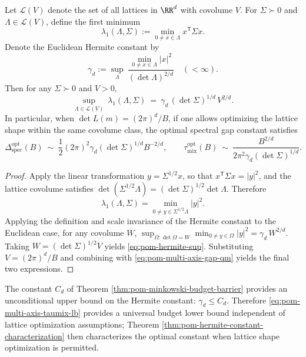 \begin{theorem}\label{thm:pom-hermite-constant-characterization}
Let \(\mathcal{L}(V)\) denote the set of all lattices in \(\RR^d\) with covolume \(V\).
For \(\Sigma\succ 0\) and \(\Lambda\in\mathcal{L}(V)\), define the first minimum
\[
\lambda_1(\Lambda,\Sigma):=\min_{0\neq x\in\Lambda}x^{\mathsf T}\Sigma x.
\]
Denote the Euclidean Hermite constant by
\[
\gamma_d:=\sup_{\Lambda}\ \frac{\min_{0\neq x\in\Lambda}|x|^{2}}{(\det\Lambda)^{2/d}}\quad(<\infty).
\]
Then for any \(\Sigma\succ 0\) and \(V>0\),
\begin{equation}\label{eq:pom-hermite-sup}
\sup_{\Lambda\in\mathcal{L}(V)}\ \lambda_1(\Lambda,\Sigma)
\ =\ \gamma_d\,(\det\Sigma)^{1/d}\,V^{2/d}.
\end{equation}
In particular, when \(\det L(m)=(2\pi)^d/B\), if one allows optimizing the lattice shape within the same covolume class, the optimal spectral gap constant satisfies
\[
\Delta_{\mathrm{spec}}^{\mathrm{opt}}(B)\ \sim\ \frac12(2\pi)^2\gamma_d(\det\Sigma)^{1/d}B^{-2/d},
\qquad
\tau_{\mathrm{mix}}^{\mathrm{opt}}(B)\ \sim\ \frac{B^{2/d}}{2\pi^2\gamma_d(\det\Sigma)^{1/d}}.
\]
\end{theorem}

\begin{proof}
Apply the linear transformation \(y=\Sigma^{1/2}x\), so that \(x^{\mathsf T}\Sigma x=|y|^2\), and the lattice covolume satisfies
\(
\det(\Sigma^{1/2}\Lambda)=(\det\Sigma)^{1/2}\det\Lambda
\).
Therefore
\[
\lambda_1(\Lambda,\Sigma)
=\min_{0\neq y\in\Sigma^{1/2}\Lambda}|y|^2.
\]
Applying the definition and scale invariance of the Hermite constant to the Euclidean case, for any covolume \(W\),
\(
\sup_{\Omega:\det\Omega=W}\min_{0\neq y\in\Omega}|y|^2=\gamma_d\,W^{2/d}
\).
Taking \(W=(\det\Sigma)^{1/2}V\) yields \eqref{eq:pom-hermite-sup}.
Substituting \(V=(2\pi)^d/B\) and combining with \eqref{eq:pom-multi-axis-gap-qm} yields the final two expressions.
\end{proof}

\begin{remark}\label{rem:pom-minkowski-vs-hermite}
The constant \(C_d\) of Theorem \ref{thm:pom-minkowski-budget-barrier} provides an unconditional upper bound on the Hermite constant: \(\gamma_d\le C_d\).
Therefore \eqref{eq:pom-multi-axis-taumix-lb} provides a universal budget lower bound independent of lattice optimization assumptions; Theorem \ref{thm:pom-hermite-constant-characterization} then characterizes the optimal constant when lattice shape optimization is permitted.
\end{remark}

